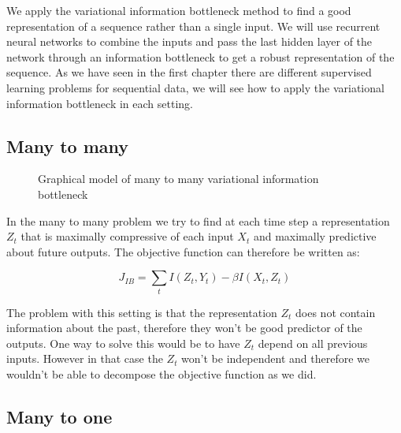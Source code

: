 \documentclass[11pt,oneside,openright]{report}
\begin{document}
We apply the variational information bottleneck method to find a good representation of a sequence rather than a single input. We will use recurrent neural networks to combine the inputs and pass the last hidden layer of the network through an information bottleneck to get a robust representation of the sequence. As we have seen in the first chapter there are different supervised learning problems for sequential data, we will see how to apply the variational information bottleneck in each setting.

\subsection{Many to many}
\begin{figure}[H]
\centering
{}
\caption{Graphical model of many to many variational information bottleneck}
\end{figure}

In the many to many problem we try to find at each time step a representation $Z_t$ that is maximally compressive of each input $X_t$ and maximally predictive about future outputs. The objective function can therefore be written as:

$$ J_{IB} = \sum_t I(Z_t, Y_{t}) - \beta I(X_{t}, Z_t)$$
 
 The problem with this setting is that the representation $Z_t$ does not contain information about the past, therefore they won't be good predictor of the outputs. One way to solve this would be to have $Z_t$ depend on all previous inputs. However in that case the $Z_t$ won't be independent and therefore we wouldn't be able to decompose the objective function as we did.
 
\subsection{Many to one}
\end{document}
